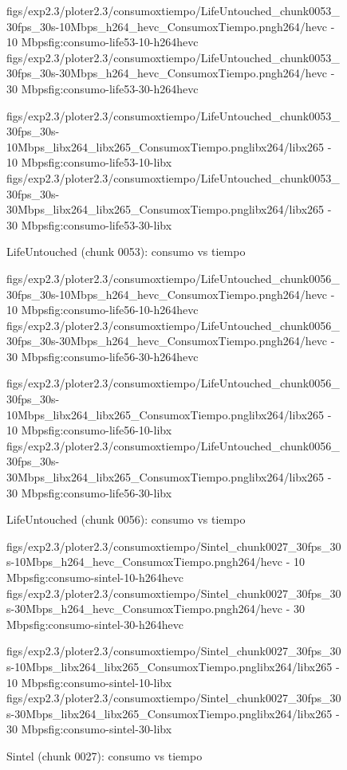 \begin{figure}[H]
  \centering
  \small
  \dosubfigs
    {figs/exp2.3/ploter2.3/consumoxtiempo/LifeUntouched_chunk0053_30fps_30s-10Mbps_h264_hevc_ConsumoxTiempo.png}{h264/hevc - 10 Mbps}{fig:consumo-life53-10-h264hevc}
    {figs/exp2.3/ploter2.3/consumoxtiempo/LifeUntouched_chunk0053_30fps_30s-30Mbps_h264_hevc_ConsumoxTiempo.png}{h264/hevc - 30 Mbps}{fig:consumo-life53-30-h264hevc}
  
  \dosubfigs
    {figs/exp2.3/ploter2.3/consumoxtiempo/LifeUntouched_chunk0053_30fps_30s-10Mbps_libx264_libx265_ConsumoxTiempo.png}{libx264/libx265 - 10 Mbps}{fig:consumo-life53-10-libx}
    {figs/exp2.3/ploter2.3/consumoxtiempo/LifeUntouched_chunk0053_30fps_30s-30Mbps_libx264_libx265_ConsumoxTiempo.png}{libx264/libx265 - 30 Mbps}{fig:consumo-life53-30-libx}
  \caption{LifeUntouched (chunk 0053): consumo vs tiempo}
  \label{fig:consumo-life53}
\end{figure}

\begin{figure}[H]
  \centering
  \small
  \dosubfigs
    {figs/exp2.3/ploter2.3/consumoxtiempo/LifeUntouched_chunk0056_30fps_30s-10Mbps_h264_hevc_ConsumoxTiempo.png}{h264/hevc - 10 Mbps}{fig:consumo-life56-10-h264hevc}
    {figs/exp2.3/ploter2.3/consumoxtiempo/LifeUntouched_chunk0056_30fps_30s-30Mbps_h264_hevc_ConsumoxTiempo.png}{h264/hevc - 30 Mbps}{fig:consumo-life56-30-h264hevc}
  
  \dosubfigs
    {figs/exp2.3/ploter2.3/consumoxtiempo/LifeUntouched_chunk0056_30fps_30s-10Mbps_libx264_libx265_ConsumoxTiempo.png}{libx264/libx265 - 10 Mbps}{fig:consumo-life56-10-libx}
    {figs/exp2.3/ploter2.3/consumoxtiempo/LifeUntouched_chunk0056_30fps_30s-30Mbps_libx264_libx265_ConsumoxTiempo.png}{libx264/libx265 - 30 Mbps}{fig:consumo-life56-30-libx}
  \caption{LifeUntouched (chunk 0056): consumo vs tiempo}
  \label{fig:consumo-life56}
\end{figure}

\begin{figure}[H]
  \centering
  \small
  \dosubfigs
    {figs/exp2.3/ploter2.3/consumoxtiempo/Sintel_chunk0027_30fps_30s-10Mbps_h264_hevc_ConsumoxTiempo.png}{h264/hevc - 10 Mbps}{fig:consumo-sintel-10-h264hevc}
    {figs/exp2.3/ploter2.3/consumoxtiempo/Sintel_chunk0027_30fps_30s-30Mbps_h264_hevc_ConsumoxTiempo.png}{h264/hevc - 30 Mbps}{fig:consumo-sintel-30-h264hevc}
  
  \dosubfigs
    {figs/exp2.3/ploter2.3/consumoxtiempo/Sintel_chunk0027_30fps_30s-10Mbps_libx264_libx265_ConsumoxTiempo.png}{libx264/libx265 - 10 Mbps}{fig:consumo-sintel-10-libx}
    {figs/exp2.3/ploter2.3/consumoxtiempo/Sintel_chunk0027_30fps_30s-30Mbps_libx264_libx265_ConsumoxTiempo.png}{libx264/libx265 - 30 Mbps}{fig:consumo-sintel-30-libx}
  \caption{Sintel (chunk 0027): consumo vs tiempo}
  \label{fig:consumo-sintel}
\end{figure}

